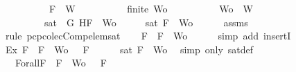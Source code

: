 \begin{isabellebody}
\ \ \ \ \ \ \ \ \ \ {\isachardoublequoteopen}F\ {\isasymin}\ W{\isachardoublequoteclose}\isanewline
\ \ \ \ \ \ \ \ \ \ {\isachardoublequoteopen}finite\ Wo{\isachardoublequoteclose}\isanewline
\ \ \ \ \ \ \ \ \ \ {\isachardoublequoteopen}Wo\ {\isasymsubseteq}\ W{\isachardoublequoteclose}\isanewline
\ \ \ \ \ \ \ \ \ {\isachardoublequoteopen}sat\ {\isacharparenleft}{\isacharbraceleft}\isactrlbold {\isasymnot}\ G{\isacharcomma}\isactrlbold {\isasymnot}\ H{\isacharcomma}F{\isacharbraceright}\ {\isasymunion}\ Wo{\isacharparenright}{\isachardoublequoteclose}\isanewline
%
\isadelimproof
%
\endisadelimproof
%
\isatagproof
{}\isamarkupfalse%
\ {\isacharminus}\isanewline
\ \ \isamarkupfalse%
\ {\isachardoublequoteopen}sat\ {\isacharparenleft}{\isacharbraceleft}F{\isacharbraceright}\ {\isasymunion}\ Wo{\isacharparenright}{\isachardoublequoteclose}\isanewline
\ \ \ \ \isamarkupfalse%
\ assms{\isacharparenleft}{}{\isacharcomma}{}{\isacharcomma}{}{\isacharcomma}{}{\isacharparenright}\ \isamarkupfalse%
\ {\isacharparenleft}rule\ pcp{\isacharunderscore}colecComp{\isacharunderscore}elem{\isacharunderscore}sat{\isacharparenright}\isanewline
\ \ \isamarkupfalse%
\ {\isachardoublequoteopen}F\ {\isasymin}\ {\isacharbraceleft}F{\isacharbraceright}\ {\isasymunion}\ Wo{\isachardoublequoteclose}\isanewline
\ \ \ \ \isamarkupfalse%
\ {\isacharparenleft}simp\ add{\isacharcolon}\ insertI{}{\isacharparenright}\isanewline
\ \ \isamarkupfalse%
\ Ex{}{\isacharcolon}{\isachardoublequoteopen}{\isasymexists}{\isasymA}{\isachardot}\ {\isasymforall}F\ {\isasymin}\ {\isacharparenleft}{\isacharbraceleft}F{\isacharbraceright}\ {\isasymunion}\ Wo{\isacharparenright}{\isachardot}\ {\isasymA}\ {\isasymTurnstile}\ F{\isachardoublequoteclose}\isanewline
\ \ \ \ \isamarkupfalse%
\ {\isacartoucheopen}sat\ {\isacharparenleft}{\isacharbraceleft}F{\isacharbraceright}\ {\isasymunion}\ Wo{\isacharparenright}{\isacartoucheclose}\ \isamarkupfalse%
\ {\isacharparenleft}simp\ only{\isacharcolon}\ sat{\isacharunderscore}def{\isacharparenright}\isanewline
\ \ \isamarkupfalse%
\ {\isasymA}\ \ Forall{}{\isacharcolon}{\isachardoublequoteopen}{\isasymforall}F\ {\isasymin}\ {\isacharparenleft}{\isacharbraceleft}F{\isacharbraceright}\ {\isasymunion}\ Wo{\isacharparenright}{\isachardot}\ {\isasymA}\ {\isasymTurnstile}\ F{\isachardoublequoteclose}\isanewline

\end{isabellebody}
